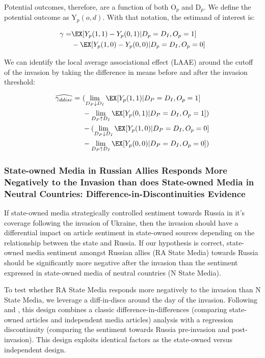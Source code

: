 \documentclass[12pt]{article}
\begin{document}
Potential outcomes, therefore, are a function of both O$_p$ and D$_p$. We define the potential outcome as Y$_p(o,d)$. With that notation, the estimand of interest is:

\begin{align}
\begin{split}
    \gamma = &\EX[Y_p(1,1) - Y_p(0,1)|D_p=D_I,O_p=1] \\
    &- \EX[Y_p(1,0) - Y_p(0,0)|D_p=D_I,O_p=0]
\end{split}
\end{align}

We can identify the local average associational effect (LAAE) around the cutoff of the invasion by taking the difference in means before and after the invasion threshold:

\begin{align}
\begin{split}
    \widehat{\gamma_{ddisc}} =\ &(\lim_{D_P \downarrow D_I} \EX [Y_p(1,1)|D_P=D_I,O_p=1] \\
    &- \lim_{D_P \uparrow D_I} \EX [Y_p(0,1)|D_P=D_I,O_p=1]) \\
    &-(\lim_{D_P \downarrow D_I} \EX [Y_p(1,0)|D_P=D_I,O_p=0] \\
    &- \lim_{D_P \uparrow D_I} \EX [Y_p(0,0)|D_P=D_I,O_p=0])
\end{split}
\end{align}

\subsubsection*{State-owned Media in Russian Allies Responds More Negatively to the Invasion than does State-owned Media in Neutral Countries: Difference-in-Discontinuities Evidence}

If state-owned media strategically controlled sentiment towards Russia in it's coverage following the invasion of Ukraine, then the invasion should have a differential impact on article sentiment in state-owned sources depending on the relationship between the state and Russia. If our hypothesis is correct, state-owned media sentiment amongst Russian allies (RA State Media) towards Russia should be significantly more negative after the invasion than the sentiment expressed in state-owned media of neutral countries (N State Media). 

To test whether RA State Media responds more negatively to the invasion than N State Media, we leverage a diff-in-discs around the day of the invasion. Following \autocite{toral_how_2024} and \autocite{grembi_fiscal_2016}, this design combines a classic difference-in-differences (comparing state-owned articles and independent media articles) analysis with a regression discontinuity (comparing the sentiment towards Russia pre-invasion and post-invasion). This design exploits identical factors as the state-owned versus independent design.
\end{document}
